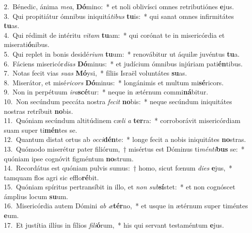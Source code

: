 {2.~}Bénedic, ánima \textit{me}\textit{a}, \textbf{Dó}mino:~* et noli oblivísci omnes retributiónes \textbf{e}jus.\\
{3.~}Qui propitiátur ómnibus iniquitá\textit{ti}\textit{bus} \textbf{tu}is:~* qui sanat omnes infirmitátes \textbf{tu}as.\\
{4.~}Qui rédimit de intéritu \textit{vi}\textit{tam} \textbf{tu}am:~* qui corónat te in misericórdia et miserati\textbf{ó}nibus.\\
{5.~}Qui replet in bonis desidé\textit{ri}\textit{um} \textbf{tu}um:~* renovábitur ut áquilæ juvéntus \textbf{tu}a.\\
{6.~}Fáciens misericór\textit{di}\textit{as} \textbf{Dó}minus:~* et judícium ómnibus injúriam pati\textbf{én}tibus.\\
{7.~}Notas fecit vias \textit{su}\textit{as} \textbf{Mó}ysi,~* fíliis Israël voluntátes \textbf{su}as.\\
{8.~}Miserátor, et misé\textit{ri}\textit{cors} \textbf{Dó}minus:~* longánimis et multum mi\textbf{sé}ricors.\\
{9.~}Non in perpétuum \textit{i}\textit{ra}\textbf{scé}tur:~* neque in ætérnum commi\textbf{ná}bitur.\\
{10.~}Non secúndum peccáta nostra \textit{fe}\textit{cit} \textbf{no}bis:~* neque secúndum iniquitátes nostras retríbuit \textbf{no}bis.\\
{11.~}Quóniam secúndum altitúdinem cæ\textit{li} \textit{a} \textbf{ter}ra:~* corroborávit misericórdiam suam super ti\textbf{mén}tes se.\\
{12.~}Quantum distat ortus ab \textit{oc}\textit{ci}\textbf{dén}te:~* longe fecit a nobis iniquitátes \textbf{no}stras.\\
{13.~}Quómodo miserétur pater filiórum,~† misértus est Dóminus ti\textit{mén}\textit{ti}\textbf{bus} se:~* quóniam ipse cognóvit figméntum \textbf{no}strum.\\
{14.~}Recordátus est quóniam pulvis sumus:~† homo, sicut fœnum \textit{di}\textit{es} \textbf{e}jus,~* tamquam flos agri sic efflo\textbf{ré}bit.\\
{15.~}Quóniam spíritus pertransíbit in illo, et \textit{non} \textit{sub}\textbf{sí}stet:~* et non cognóscet ámplius locum \textbf{su}um.\\
{16.~}Misericórdia autem Dómini \textit{ab} \textit{æ}\textbf{tér}no,~* et usque in ætérnum super timéntes \textbf{e}um.\\
{17.~}Et justítia illíus in fílios \textit{fi}\textit{li}\textbf{ó}rum,~* his qui servant testaméntum \textbf{e}jus.\\
